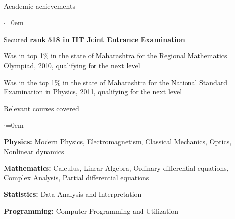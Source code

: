 \documentclass[a4paper,11pt]{resume}%
\begin{document}
\\[8\baselineskip]
\begin{rSection}{Academic achievements}
\begin{list}{$\cdot$}{\leftmargin=0em}
\item Secured {\bf rank 518 in IIT Joint Entrance Examination}
\item Was in top 1\% in the state of Maharashtra for the Regional Mathematics Olympiad, 2010, qualifying for the next level
\item Was in the top 1\% in the state of Maharashtra for the National Standard Examination in Physics, 2011, qualifying for the next level
\end{list}
\end{rSection}
\begin{rSection}{Relevant courses covered}
\begin{list}{$\cdot$}{\leftmargin=0em}
\item {\bf Physics:} Modern Physics, Electromagnetism, Classical Mechanics, Optics, Nonlinear dynamics
\item {\bf Mathematics:} Calculus, Linear Algebra, Ordinary differential equations, Complex Analysis, Partial differential equations
\item {\bf Statistics:} Data Analysis and Interpretation
\item {\bf Programming:} Computer Programming and Utilization
\end{list}
\end{rSection}
\end{document}
